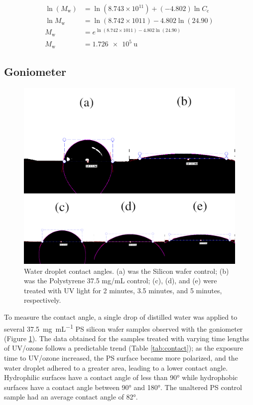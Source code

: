 \documentclass[twocolumn]{article}
\begin{document}
                \begin{align}
                    \ln{(M_\text{w})} &= \ln{(8.743 \times 10^{11})} + (- 4.802) \ln{C_\text{c}}\\
                    \ln{M_\text{w}} &= \ln{(8.742 \times 1011)} - 4.802 \ln{(24.90)} \nonumber\\
                    M_\text{w} &= e^{\ln{(8.742 \times 1011)} - 4.802 \ln{(24.90)}} \nonumber\\
                    M_\text{w} &= \qty{1.726e5}{\atomicmassunit} \nonumber
                \end{align}

            \subsection{Goniometer}
                \begin{figure}
                    \centering
                    \includegraphics[width=0.8\columnwidth]{img/contact.png}
                    \caption{Water droplet contact angles. (a) was the Silicon wafer control; (b) was the Polystyrene 37.5 mg/mL control; (c), (d), and (e) were treated with UV light for 2 minutes, 3.5 minutes, and 5 minutes, respectively.}\label{fig:contact}
                \end{figure}
                To measure the contact angle, a single drop of distilled water was applied to several \qty{37.5}{\milli\gram\per\milli\liter} PS silicon wafer samples observed with the goniometer (Figure \ref{fig:contact}). The data obtained for the samples treated with varying time lengths of UV/ozone follows a predictable trend (Table \ref{tab:contact}); as the exposure time to UV/ozone increased, the PS surface became more polarized, and the water droplet adhered to a greater area, leading to a lower contact angle. Hydrophilic surfaces have a contact angle of less than 90° while hydrophobic surfaces have a contact angle between 90° and 180°. The unaltered PS control sample had an average contact angle of 82°.
\end{document}
